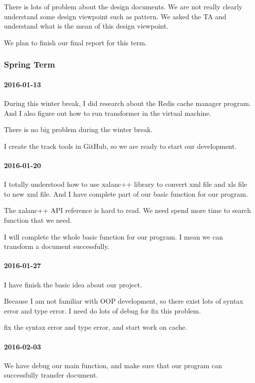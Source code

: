 There is lots of problem about the design documents. We are not really clearly understand some design viewpoint such as pattern. We asked the TA and understand what is the mean of this design viewpoint.


We plan to finish our final report for this term.
\subsubsection{Spring Term}
\paragraph{2016-01-13}
During this winter break, I did research about the Redis cache manager program. And I also figure out how to run transformer in the virtual machine.


There is no big problem during the winter break.


I create the track tools in GitHub, so we are ready to start our development.

\paragraph{2016-01-20}
I totally understood how to use xalanc++ library to convert xml file and xls file to new xml file. And I have complete part of our basic function for our program.


The xalanc++ API reference is hard to read. We need spend more time to search function that we need.


I will complete the whole basic function for our program. I mean we can transform a document successfully.

\paragraph{2016-01-27}
I have finish the basic idea about our project.


Because I am not familiar with OOP development, so there exist lots of syntax error and type error. I need do lots of debug for fix this problem.


fix the syntax error and type error, and start work on cache.

\paragraph{2016-02-03}
We have debug our main function, and make sure that our program can successfully transfer document.


